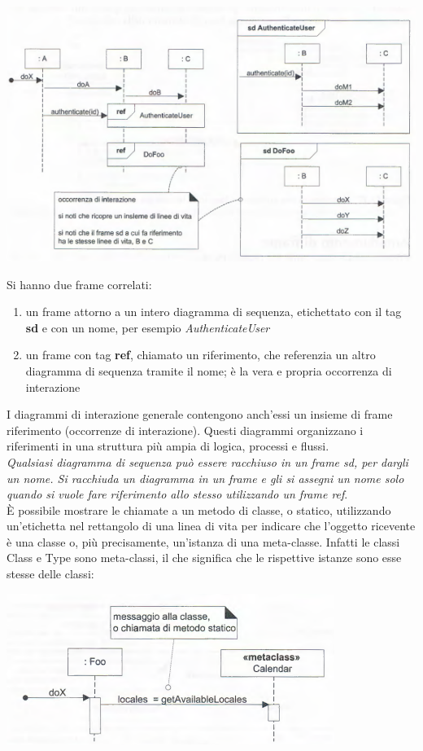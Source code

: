 \documentclass[a4paper,12pt, oneside]{book}
\begin{document}
\begin{center}
	\includegraphics[scale=0.7]{img/corrd.png}
\end{center}
\newpage
Si hanno due frame correlati:
\begin{enumerate}
	\item un frame attorno a un intero diagramma di sequenza, etichettato con il tag \textbf{sd} e con un nome, per esempio \textit{AuthenticateUser}
	\item un frame con tag \textbf{ref}, chiamato un riferimento, che referenzia un altro diagramma di sequenza tramite il nome; è la vera e propria occorrenza di interazione
\end{enumerate}
I diagrammi di interazione generale contengono anch'essi un insieme di frame riferimento (occorrenze di interazione). Questi diagrammi organizzano i riferimenti in una struttura più ampia di logica, processi e flussi.\\
\textit{Qualsiasi diagramma di sequenza può essere racchiuso in un frame sd, per dargli un nome. Si racchiuda un diagramma in un frame e gli si assegni un nome solo
quando si vuole fare riferimento allo stesso utilizzando un frame ref}.\\
È possibile mostrare le chiamate a un metodo di classe, o statico, utilizzando un'etichetta
nel rettangolo di una linea di vita per indicare che l'oggetto ricevente è una classe o, più
precisamente, un'istanza di una meta-classe. Infatti le classi Class e Type sono meta-classi, il che significa che le rispettive istanze sono esse stesse delle classi:
\begin{center}
	\includegraphics[scale=0.7]{img/classd.png}
\end{center}
\end{document}
